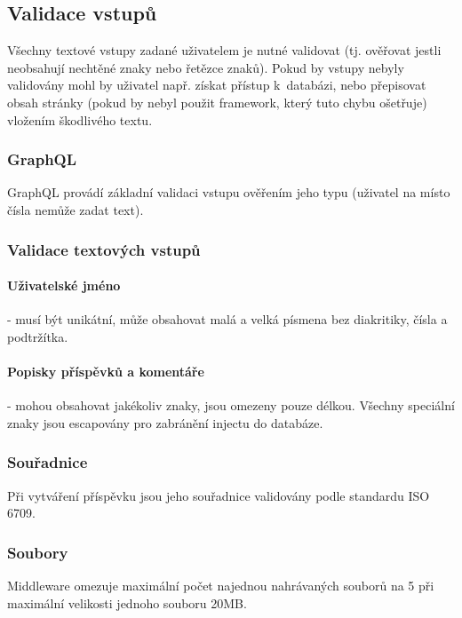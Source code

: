 \documentclass[12pt, a4paper,
  oneside,      %
]{report}
\begin{document}
\subsection{Validace vstupů}
Všechny textové vstupy zadané uživatelem je nutné validovat (tj. ověřovat jestli neobsahují nechtěné znaky nebo řetězce znaků). Pokud by vstupy nebyly validovány mohl by uživatel např. získat přístup k~databázi, nebo přepisovat obsah stránky (pokud by nebyl použit framework, který tuto chybu ošetřuje) vložením škodlivého textu.
\subsubsection{GraphQL}
GraphQL provádí základní validaci vstupu ověřením jeho typu (uživatel na místo čísla nemůže zadat text).
\subsubsection{Validace textových vstupů}
\paragraph{Uživatelské jméno}\label{paragraph:username} - musí být unikátní, může obsahovat malá a velká písmena bez diakritiky, čísla a podtržítka.
\paragraph{Popisky příspěvků a komentáře} - mohou obsahovat jakékoliv znaky, jsou omezeny pouze délkou. Všechny speciální znaky jsou escapovány pro zabránění injectu do databáze.
\subsubsection{Souřadnice} Při vytváření příspěvku jsou jeho souřadnice validovány podle standardu ISO 6709.
\subsubsection{Soubory} Middleware omezuje maximální počet najednou nahrávaných souborů na 5 při maximální velikosti jednoho souboru 20MB.
\end{document}
